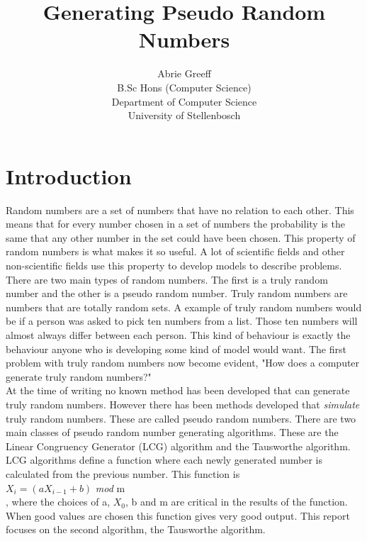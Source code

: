\documentclass[a4paper,11pt,titlepage]{article}
\author{Abrie Greeff\\B.Sc Hons (Computer Science)\\Department of Computer Science\\University of Stellenbosch}
\title{Generating Pseudo Random Numbers}
\begin{document}
\maketitle
\tableofcontents
\section{Introduction}
Random numbers are a set of numbers that have no relation to each other. This means that for every number chosen in a set of numbers the probability is the same that any other number in the set could have been chosen. This property of random numbers is what makes it so useful. A lot of scientific fields and other non-scientific fields use this property to develop models to describe problems.\\
There are two main types of random numbers. The first is a truly random number and the other is a pseudo random number. Truly random numbers are numbers that are totally random sets. A example of truly random numbers would be if a person was asked to pick ten numbers from a list. Those ten numbers will almost always differ between each person. This kind of behaviour is exactly the behaviour anyone who is developing some kind of model would want. The first problem with truly random numbers now become evident, "How does a computer generate truly random numbers?" \\
At the time of writing no known method has been developed that can generate truly random numbers. However there has been methods developed that \emph{simulate} truly random numbers. These are called pseudo random numbers. There are two main classes of pseudo random number generating algorithms. These are the Linear Congruency Generator (LCG) algorithm and the Tausworthe algorithm.\\
LCG algorithms define a function where each newly generated number is calculated from the previous number. This function is\\
$X_i = (aX_{i-1}+b)$ \emph{mod} m\\
, where the choices of a, $X_0$, b and m are critical in the results of the function.	When good values are chosen this function gives very good output. This report focuses on the second algorithm, the Tausworthe algorithm.
\end{document}
